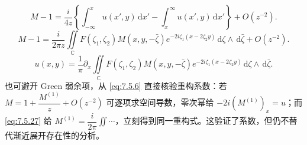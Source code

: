 \documentclass[lang=cn,scheme=chinese,mode=simple,device=normal,color=blue,math=cm,thmcnt=section,12pt]{elegantbook}
\newcommand{\dd}{\,\mathrm{d}}
\newcommand{\eqq}[2]{\tag{#1}\label{eq:#1}#2}
\begin{document}
\begin{equation}
\eqq{7.5.26}{M-1=\dfrac{i}{4z}\left\{\int_{-\infty}^xu(x',y)\dd x'-\int_x^\infty u(x',y)\dd x'\right\}+O(z^{-2}).}
\end{equation}
\begin{equation}
\eqq{7.5.27}{M-1=\dfrac{i}{2\pi z}\iint\limits_{\mathbb C}
F(\zeta_1,\zeta_2)M(x,y,-\bar\zeta)e^{-2i\zeta_1(x-2\zeta_2y)}\dd\zeta\wedge\dd\bar\zeta+O(z^{-2}).}
\end{equation}
\begin{equation}
\eqq{7.5.28}{u(x,y)=\dfrac{1}{\pi}\partial_x\iint\limits_{\mathbb C}
F(\zeta_1,\zeta_2)M(x,y,-\bar\zeta)e^{-2i\zeta_1(x-2\zeta_2y)}\dd\zeta\wedge\dd\bar\zeta.}
\end{equation}
也可避开 Green 弱余项，从 \eqref{eq:7.5.6} 直接核验重构系数：若 $M=1+\dfrac{M^{(1)}}{z}+O(z^{-2})$ 可逐项求空间导数，零次幂给 $-2i(M^{(1)})_x=u$；而 \eqref{eq:7.5.27} 给 $M^{(1)}=\dfrac{i}{2\pi}\displaystyle\iint\cdots$，立刻得到同一重构式。这验证了系数，但仍不替代渐近展开存在性的分析。
\end{document}
